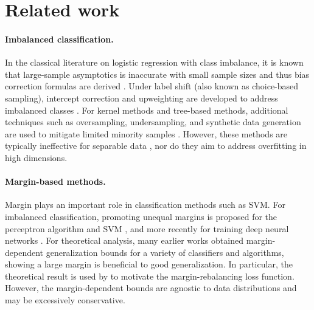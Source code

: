 \section{Related work}


\paragraph{Imbalanced classification.} In the classical literature on logistic regression with class imbalance, it is known that large-sample asymptotics is inaccurate with small sample sizes and thus bias correction formulas are derived \cite{schaefer1983bias, anderson1979logistic, mccullagh1983generalized}. Under label shift (also known as choice-based sampling), intercept correction and upweighting are developed to address imbalanced classes \cite{xie1989logit, king2001logistic}. For kernel methods and tree-based methods, additional techniques such as oversampling, undersampling, and synthetic data generation are used to mitigate limited minority samples \cite{he2009learning, chawla2002smote, he2008adasyn}. However, these methods are typically ineffective for separable data \cite{cao2019learning}, nor do they aim to address overfitting in high dimensions.


\paragraph{Margin-based methods.} Margin plays an important role in classification methods such as SVM. For imbalanced classification, promoting unequal margins is proposed for the perceptron algorithm \cite{li2002perceptron} and SVM \cite{li2005using}, and more recently for training deep neural networks \cite{huang2016learning, khan2019striking, liu2019large, cao2019learning}. For theoretical analysis, 
many earlier works \cite{bartlett1996valid, bartlett1998boosting, koltchinskii2002empirical, bartlett2002rademacher, bartlett2017spectrally} obtained margin-dependent generalization bounds for a variety of classifiers and algorithms,
showing a large margin is beneficial to good generalization.
In particular, the theoretical result \cite{koltchinskii2002empirical}
is used by \cite{cao2019learning} to motivate the margin-rebalancing loss function.
However, the margin-dependent bounds are agnostic to data distributions and may be excessively conservative. 

